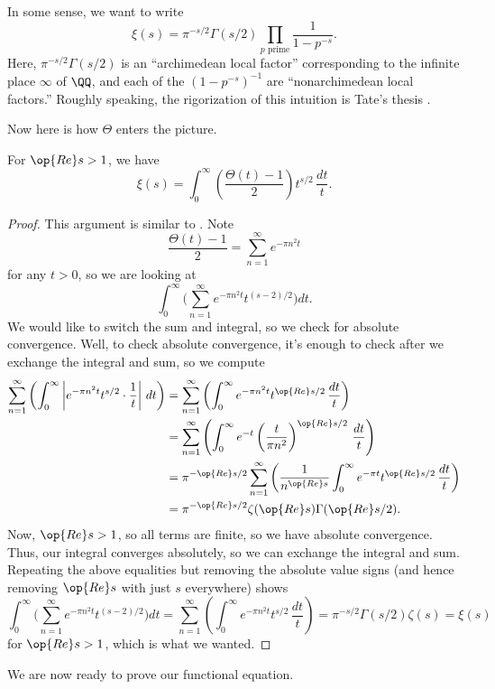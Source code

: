 \documentclass[../notes.tex]{subfiles}
\begin{document}
\begin{remark}
	In some sense, we want to write
	\[\xi(s)=\pi^{-s/2}\Gamma(s/2)\prod_{p\text{ prime}}\frac1{1-p^{-s}}.\]
	Here, $\pi^{-s/2}\Gamma(s/2)$ is an ``archimedean local factor'' corresponding to the infinite place $\infty$ of $\QQ$, and each of the $\left(1-p^{-s}\right)^{-1}$ are ``nonarchimedean local factors.'' Roughly speaking, the rigorization of this intuition is Tate's thesis \cite{tate-thesis}.
\end{remark}
Now here is how $\Theta$ enters the picture.
\begin{lemma} \label{lem:xi-as-integral}
	For $\op{Re}s>1$, we have
	\[\xi(s)=\int_0^\infty\left(\frac{\Theta(t)-1}2\right)t^{s/2}\,\frac{dt}t.\]
\end{lemma}
\begin{proof}
	This argument is similar to . Note
	\[\frac{\Theta(t)-1}2=\sum_{n=1}^\infty e^{-\pi n^2t}\]
	for any $t>0$, so we are looking at
	\[\int_0^\infty\Bigg(\sum_{n=1}^\infty e^{-\pi n^2t}t^{(s-2)/2}\Bigg)dt.\]
	We would like to switch the sum and integral, so we check for absolute convergence. Well, to check absolute convergence, it's enough to check after we exchange the integral and sum, so we compute
	\begin{align*}
		\sum_{n=1}^\infty\left(\int_0^\infty\left|e^{-\pi n^2t}t^{s/2}\cdot\frac1t\right|\,dt\right) &= \sum_{n=1}^\infty\left(\int_0^\infty e^{-\pi n^2t}t^{\op{Re}s/2}\,\frac{dt}t\right) \\
		&= \sum_{n=1}^\infty\left(\int_0^\infty e^{-t}\left(\frac t{\pi n^2}\right)^{\op{Re}s/2}\,\frac{dt}t\right) \\
		&= \pi^{-\op{Re}s/2}\sum_{n=1}^\infty\left(\frac1{n^{\op{Re}s}}\int_0^\infty e^{-\pi t}t^{\op{Re}s/2}\,\frac{dt}t\right) \\
		&= \pi^{-\op{Re}s/2}\zeta(\op{Re}s)\Gamma(\op{Re}s/2).
	\end{align*}
	Now, $\op{Re}s>1$, so all terms are finite, so we have absolute convergence. Thus, our integral converges absolutely, so we can exchange the integral and sum. Repeating the above equalities but removing the absolute value signs (and hence removing $\op{Re}s$ with just $s$ everywhere) shows
	\[\int_0^\infty\Bigg(\sum_{n=1}^\infty e^{-\pi n^2t}t^{(s-2)/2}\Bigg)dt=\sum_{n=1}^\infty\left(\int_0^\infty e^{-\pi n^2t}t^{s/2}\,\frac{dt}t\right)=\pi^{-s/2}\Gamma(s/2)\zeta(s)=\xi(s)\]
	for $\op{Re}s>1$, which is what we wanted.
\end{proof}
We are now ready to prove our functional equation.
\end{document}
